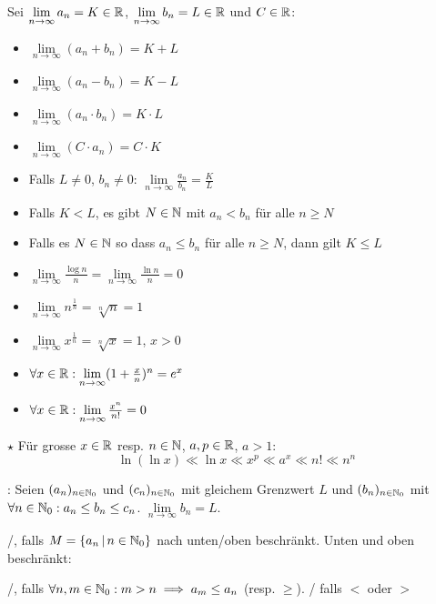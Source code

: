 \Satz Sei $\lim\limits_{n\to\infty} a_n = K \in \mathbb{R}$,
$\lim\limits_{n\to\infty} b_n = L \in \mathbb{R}$ und $C \in \mathbb{R}$:
\vspace{-0.6em}
\begin{itemize}
    \item $\lim\limits_{n\to\infty}(a_n + b_n) = K + L$
    \item $\lim\limits_{n\to\infty}(a_n - b_n) = K - L$
    \item $\lim\limits_{n\to\infty}(a_n \cdot b_n) = K \cdot L$
    \item $\lim\limits_{n\to\infty}(C \cdot a_n) = C \cdot K$
    \item Falls $L\ne 0$, $b_n\ne 0$: $\lim\limits_{n\to\infty}\frac{a_n}{b_n} = \frac{K}{L}$
    \item Falls $K < L$, es gibt $N \in \mathbb{N}$ mit $a_n < b_n$ für alle $n\ge N$
    \item Falls es $N \in \mathbb{N}$ so dass $a_n\le b_n$ für alle $n\ge N$, dann gilt $K\le L$
\end{itemize}

\Satz {}
\vspace{-0.6em}
\begin{itemize}
    \item $\lim\limits_{n\to\infty} \frac{\log n}{n} = \lim\limits_{n\to\infty} \frac{\ln n}{n} =0$
    \item $\lim\limits_{n\to\infty} n^\frac{1}{n} = \sqrt[n]{n} = 1$
    \item $\lim\limits_{n\to\infty} x^\frac{1}{n} = \sqrt[n]{x} = 1$, $x > 0$
    \item $\forall x \in \mathbb{R} : \lim\limits_{n\to\infty} (1 + \frac{x}{n})^n = e^x$
    \item $\forall x \in \mathbb{R} : \lim\limits_{n\to\infty} \frac{x^n}{n!} = 0$
\end{itemize}

\Satz $\star$ Für grosse $x \in \mathbb{R}$ resp. $n \in \mathbb{N}$, $a, p \in \mathbb{R}$, $a > 1$:
$$\ln(\ln x) \ll \ln x \ll x^p \ll a^x \ll n! \ll n^n$$

\Satz {}:
Seien $(a_n)_{n\in\mathbb{N}_0}$ und $(c_n)_{n\in\mathbb{N}_0}$ mit gleichem Grenzwert $L$ und
$(b_n)_{n\in\mathbb{N}_0}$ mit $\forall n \in \mathbb{N}_0 : a_n\le b_n\le c_n$. $\lim\limits_{n\to\infty} b_n = L$.

\Def {}/, falls $M = \{a_n \, | \, n \in \mathbb{N}_0\}$
nach unten/oben beschränkt. Unten und oben beschränkt: 

\Def {}/,
falls $\forall n,m \in \mathbb{N}_0 : m > n \implies a_m\le a_n$ (resp. $\geq$).
/ falls $<$ oder $>$

